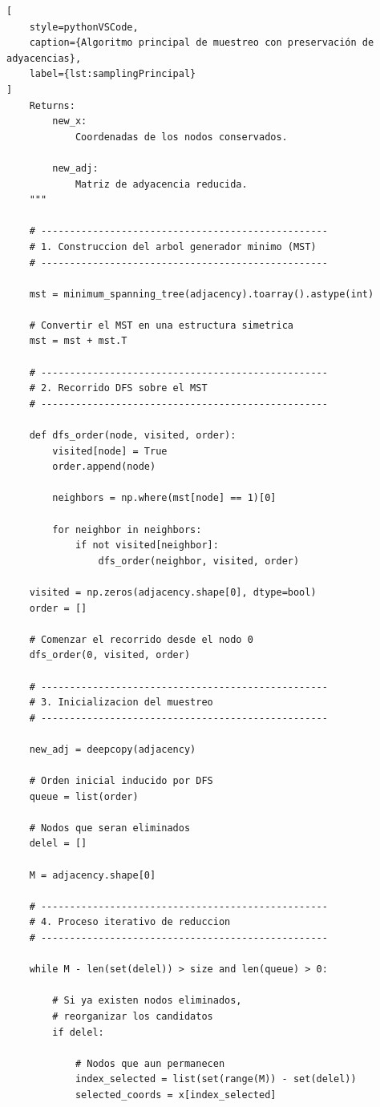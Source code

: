 \begin{lstlisting}[
    style=pythonVSCode,
    caption={Algoritmo principal de muestreo con preservación de adyacencias},
    label={lst:samplingPrincipal}
]
    Returns:
        new_x:
            Coordenadas de los nodos conservados.

        new_adj:
            Matriz de adyacencia reducida.
    """

    # --------------------------------------------------
    # 1. Construccion del arbol generador minimo (MST)
    # --------------------------------------------------

    mst = minimum_spanning_tree(adjacency).toarray().astype(int)

    # Convertir el MST en una estructura simetrica
    mst = mst + mst.T

    # --------------------------------------------------
    # 2. Recorrido DFS sobre el MST
    # --------------------------------------------------

    def dfs_order(node, visited, order):
        visited[node] = True
        order.append(node)

        neighbors = np.where(mst[node] == 1)[0]

        for neighbor in neighbors:
            if not visited[neighbor]:
                dfs_order(neighbor, visited, order)

    visited = np.zeros(adjacency.shape[0], dtype=bool)
    order = []

    # Comenzar el recorrido desde el nodo 0
    dfs_order(0, visited, order)

    # --------------------------------------------------
    # 3. Inicializacion del muestreo
    # --------------------------------------------------

    new_adj = deepcopy(adjacency)

    # Orden inicial inducido por DFS
    queue = list(order)

    # Nodos que seran eliminados
    delel = []

    M = adjacency.shape[0]

    # --------------------------------------------------
    # 4. Proceso iterativo de reduccion
    # --------------------------------------------------

    while M - len(set(delel)) > size and len(queue) > 0:

        # Si ya existen nodos eliminados,
        # reorganizar los candidatos
        if delel:

            # Nodos que aun permanecen
            index_selected = list(set(range(M)) - set(delel))
            selected_coords = x[index_selected]


\end{lstlisting}
